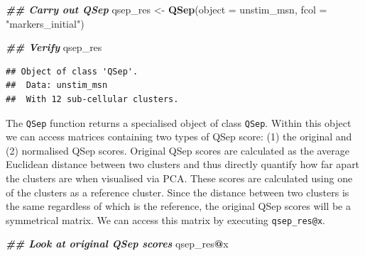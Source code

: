 \documentclass[9pt,a4paper,]{extarticle}
\newenvironment{Shaded}{\begin{snugshade}}{\end{snugshade}}
\newcommand{\AttributeTok}[1]{\textcolor[rgb]{0.13,0.29,0.53}{#1}}
\newcommand{\DocumentationTok}[1]{\textcolor[rgb]{0.56,0.35,0.01}{\textbf{\textit{#1}}}}
\newcommand{\FunctionTok}[1]{\textcolor[rgb]{0.13,0.29,0.53}{\textbf{#1}}}
\newcommand{\NormalTok}[1]{#1}
\newcommand{\OtherTok}[1]{\textcolor[rgb]{0.56,0.35,0.01}{#1}}
\newcommand{\SpecialCharTok}[1]{\textcolor[rgb]{0.81,0.36,0.00}{\textbf{#1}}}
\newcommand{\StringTok}[1]{\textcolor[rgb]{0.31,0.60,0.02}{#1}}
\begin{document}
\begin{Shaded}
\begin{Highlighting}[]
\DocumentationTok{\#\# Carry out QSep}
\NormalTok{qsep\_res }\OtherTok{\textless{}{-}} \FunctionTok{QSep}\NormalTok{(}\AttributeTok{object =}\NormalTok{ unstim\_msn, }\AttributeTok{fcol =} \StringTok{"markers\_initial"}\NormalTok{)}

\DocumentationTok{\#\# Verify}
\NormalTok{qsep\_res}
\end{Highlighting}
\end{Shaded}

\begin{verbatim}
## Object of class 'QSep'.
##  Data: unstim_msn 
##  With 12 sub-cellular clusters.
\end{verbatim}

The \texttt{QSep} function returns a specialised object of class \texttt{QSep}. Within this
object we can access matrices containing two types of QSep score: (1) the original
and (2) normalised QSep scores. Original QSep scores are calculated as the average
Euclidean distance between two clusters and thus directly quantify how far apart
the clusters are when visualised via PCA. These scores are calculated using one
of the clusters as a reference cluster. Since the distance between two clusters
is the same regardless of which is the reference, the original QSep scores will
be a symmetrical matrix. We can access this matrix by executing \texttt{qsep\_res@x}.

\begin{Shaded}
\begin{Highlighting}[]
\DocumentationTok{\#\# Look at original QSep scores }
\NormalTok{qsep\_res}\SpecialCharTok{@}\NormalTok{x}
\end{Highlighting}
\end{Shaded}
\end{document}
